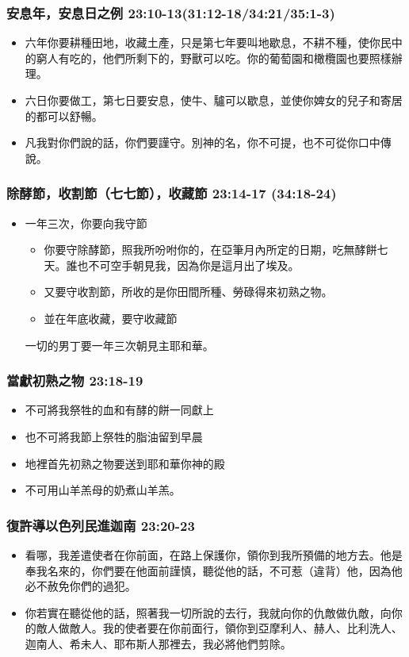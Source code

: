 \subsubsection{安息年，安息日之例 23:10-13(31:12-18/34:21/35:1-3)}
\begin{itemize} 
\itemsep-.35em
\item 六年你要耕種田地，收藏土產，只是第七年要叫地歇息，不耕不種，使你民中的窮人有吃的，他們所剩下的，野獸可以吃。你的葡萄園和橄欖園也要照樣辦理。
\item 六日你要做工，第七日要安息，使牛、驢可以歇息，並使你婢女的兒子和寄居的都可以舒暢。 
\item 凡我對你們說的話，你們要謹守。別神的名，你不可提，也不可從你口中傳說。
\end{itemize}

\subsubsection{除酵節，收割節（七七節），收藏節 23:14-17 (34:18-24)}
\begin{itemize} 
\itemsep-.35em
\item 一年三次，你要向我守節
\begin{itemize} 
\itemsep-.35em
\item 你要守除酵節，照我所吩咐你的，在亞筆月內所定的日期，吃無酵餅七天。誰也不可空手朝見我，因為你是這月出了埃及。
\item 又要守收割節，所收的是你田間所種、勞碌得來初熟之物。
\item 並在年底收藏，要守收藏節
\end{itemize}
一切的男丁要一年三次朝見主耶和華。
\end{itemize}

\subsubsection{當獻初熟之物 23:18-19}
\begin{itemize} 
\itemsep-.35em
\item 不可將我祭牲的血和有酵的餅一同獻上
\item 也不可將我節上祭牲的脂油留到早晨
\item 地裡首先初熟之物要送到耶和華你神的殿
\item 不可用山羊羔母的奶煮山羊羔。
\end{itemize}

\subsubsection{復許導以色列民進迦南 23:20-23}
\begin{itemize} 
\itemsep-.35em
\item 看哪，我差遣使者在你前面，在路上保護你，領你到我所預備的地方去。他是奉我名來的，你們要在他面前謹慎，聽從他的話，不可惹（違背）他，因為他必不赦免你們的過犯。
\item 你若實在聽從他的話，照著我一切所說的去行，我就向你的仇敵做仇敵，向你的敵人做敵人。我的使者要在你前面行，領你到亞摩利人、赫人、比利洗人、迦南人、希未人、耶布斯人那裡去，我必將他們剪除。
\end{itemize}

